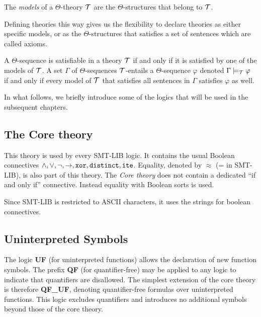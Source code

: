 \begin{definition}[Models] The \emph{models} of a $\Theta$-theory $\cal{T}$ are the $\Theta$-structures
that belong to $\cal{T}$.
\end{definition}

Defining theories this way gives us the flexibility to declare theories as either specific models, or as the $\Theta$-structures that satisfies a set of sentences which are called axioms.

\begin{definition}
A $\Theta$-sequence is satisfiable in a theory $\cal{T}$ if and only if it is satisfied by one of the models of $\cal{T}$.
A set $\Gamma$ of $\Theta$-sequences $\cal{T}$-entails a $\Theta$-sequence $\varphi$ denoted
$\Gamma \models_{\cal{T}} \varphi$ \index{$\models$} if and only if every model of $\cal{T}$ that satisfies all sentences in $\Gamma$ satisfies $\varphi$ as well.
\end{definition}

In what follows, we briefly introduce some of the logics that will be used in the subsequent chapters.

\subsection{The Core theory}

This theory is used by every SMT-LIB logic. It contains the usual Boolean connectives $\land, \lor, \neg, \to, \kw{xor}, \kw{distinct}, \kw{ite}$.
Equality, denoted by $\approx$ (= in SMT-LIB), is also part of this theory.
The \emph{Core theory} does not contain a dedicated ``if and only if'' connective.
Instead equality with Boolean sorts is used.

\begin{remark}
Since SMT-LIB is restricted to ASCII characters, it uses the strings  for boolean  connectives. 
\end{remark}

\subsection{Uninterpreted Symbols}

The logic \textbf{UF} (for uninterpreted functions) allows the declaration of new function symbols.
The prefix \textbf{QF} (for quantifier-free) may be applied to any logic to indicate that quantifiers are disallowed.
The simplest extension of the core theory is therefore \textbf{QF\_UF}, denoting quantifier-free formulas over uninterpreted functions.
This logic excludes quantifiers and introduces no additional symbols beyond those of the core theory.

